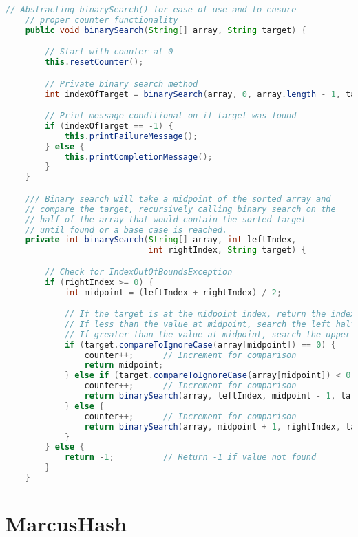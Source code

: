 \documentclass[letterpaper, 10pt]{article}
\begin{document}
\vspace{6.0em}

\begin{lstlisting}[language=Java, firstnumber=36]
    // Abstracting binarySearch() for ease-of-use and to ensure
    // proper counter functionality
    public void binarySearch(String[] array, String target) {

        // Start with counter at 0
        this.resetCounter();

        // Private binary search method
        int indexOfTarget = binarySearch(array, 0, array.length - 1, target);

        // Print message conditional on if target was found
        if (indexOfTarget == -1) {
            this.printFailureMessage();
        } else {
            this.printCompletionMessage();
        }
    }

    /// Binary search will take a midpoint of the sorted array and
    // compare the target, recursively calling binary search on the
    // half of the array that would contain the sorted target
    // until found or a base case is reached.
    private int binarySearch(String[] array, int leftIndex,
                             int rightIndex, String target) {

        // Check for IndexOutOfBoundsException
        if (rightIndex >= 0) {
            int midpoint = (leftIndex + rightIndex) / 2;

            // If the target is at the midpoint index, return the index
            // If less than the value at midpoint, search the left half
            // If greater than the value at midpoint, search the upper half
            if (target.compareToIgnoreCase(array[midpoint]) == 0) {
                counter++;      // Increment for comparison
                return midpoint;
            } else if (target.compareToIgnoreCase(array[midpoint]) < 0) {
                counter++;      // Increment for comparison
                return binarySearch(array, leftIndex, midpoint - 1, target);
            } else {
                counter++;      // Increment for comparison
                return binarySearch(array, midpoint + 1, rightIndex, target);
            }
        } else {
            return -1;          // Return -1 if value not found
        }
    }
\end{lstlisting}

\section{MarcusHash}
\end{document}
